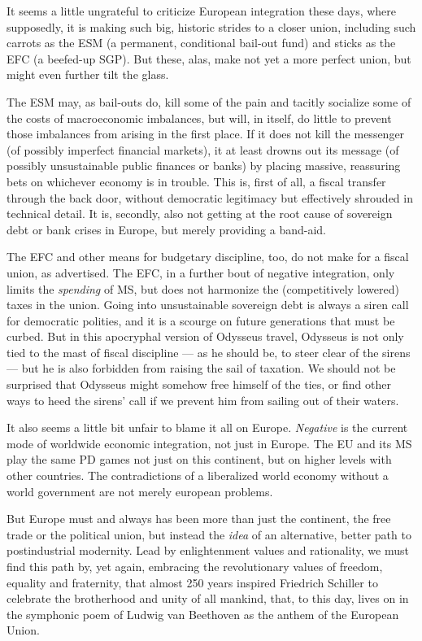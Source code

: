 \documentclass[11pt,a4paper,oneside,openright]{article}
\begin{document}
It seems a little ungrateful to criticize European integration these days, where supposedly, it is making such big, historic strides to a closer union, including such carrots as the \gls{ESM} (a permanent, conditional bail-out fund) and sticks as the \gls{EFC} (a beefed-up \gls{SGP}).
But these, alas, make not yet a more perfect union, but might even further tilt the glass. 

The \gls{ESM} may, as bail-outs do, kill some of the pain and tacitly socialize some of the costs of macroeconomic imbalances, but will, in itself, do little to prevent those imbalances from arising in the first place. 
If it does not kill the messenger (of possibly imperfect financial markets), it at least drowns out its message (of possibly unsustainable public finances or banks) by placing massive, reassuring bets on whichever economy is in trouble. 
This is, first of all, a fiscal transfer through the back door, without democratic legitimacy but effectively  shrouded in technical detail. 
It is, secondly, also not getting at the root cause of sovereign debt or bank crises in Europe, but merely providing a band-aid.

The \gls{EFC} and other means for budgetary discipline, too, do not make for a fiscal union, as advertised. 
The \gls{EFC}, in a further bout of negative integration, only limits the \emph{spending} of \gls{MS}, but does not harmonize the (competitively lowered) taxes in the union. 
Going into unsustainable sovereign debt is always a siren call for democratic polities, and it is a scourge on future generations that must be curbed. 
But in this apocryphal version of Odysseus travel, Odysseus is not only tied to the mast of fiscal discipline --- as he should be, to steer clear of the sirens --- but he is also forbidden from raising the sail of taxation. 
We should not be surprised that Odysseus might somehow free himself of the ties, or find other ways to heed the sirens' call if we prevent him from sailing out of their waters.

It also seems a little bit unfair to blame it all on Europe. 
\emph{Negative} is the current mode of worldwide economic integration, not just in Europe. 
The \gls{EU} and its \gls{MS} play the same \gls{PD} games not just on this continent, but on higher levels with other countries. 
The contradictions of a liberalized world economy without a world government are not merely european problems.

But Europe must and always has been more than just the continent, the free trade or the political union, but instead the \emph{idea} of an alternative, better path to postindustrial modernity. 
Lead by enlightenment values and rationality, we must find this path by, yet again, embracing the revolutionary values of freedom, equality and fraternity, that almost 250 years inspired Friedrich Schiller to celebrate the brotherhood and unity of all mankind, that, to this day, lives on in the symphonic poem of Ludwig van Beethoven as the anthem of the European Union.
\end{document}
